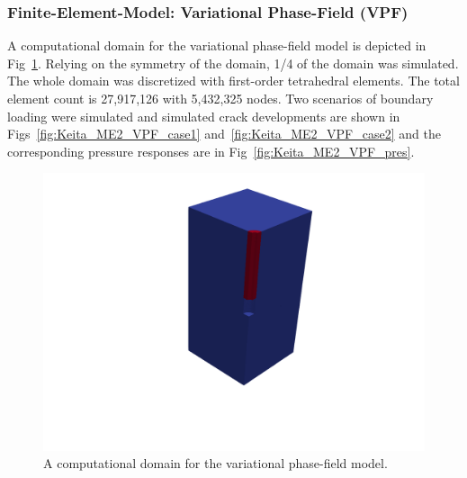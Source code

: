 

\subsubsection*{Finite-Element-Model: Variational Phase-Field (VPF)}

A computational domain for the variational phase-field model is depicted in Fig~\ref{fig:VPF_init}.
Relying on the symmetry of the domain, 1/4 of the domain was simulated. 
The whole domain was discretized with first-order tetrahedral elements.
The total element count is 27,917,126 with 5,432,325 nodes.
Two scenarios of boundary loading were simulated and simulated crack developments are shown in Figs~\ref{fig:Keita_ME2_VPF_case1} and~\ref{fig:Keita_ME2_VPF_case2} and the corresponding pressure responses are in Fig~\ref{fig:Keita_ME2_VPF_pres}.

\begin{figure}[!ht]
\centering
\includegraphics[width=1.0\textwidth]{figures/VPF_init.png}
\caption{A computational domain for the variational phase-field model.}
\label{fig:VPF_init}
\end{figure}

